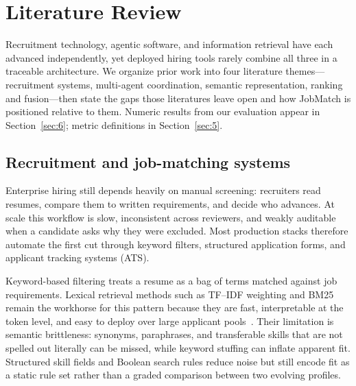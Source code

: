 \section{Literature Review}\label{sec:2}

Recruitment technology, agentic software, and information retrieval have each advanced independently, yet deployed hiring tools rarely combine all three in a traceable architecture.
We organize prior work into four literature themes---recruitment systems, multi-agent coordination, semantic representation, ranking and fusion---then state the gaps those literatures leave open and how JobMatch is positioned relative to them.
Numeric results from our evaluation appear in Section~\ref{sec:6}; metric definitions in Section~\ref{sec:5}.

\subsection{Recruitment and job-matching systems}\label{sec:2-recruitment}

Enterprise hiring still depends heavily on manual screening: recruiters read resumes, compare them to written requirements, and decide who advances.
At scale this workflow is slow, inconsistent across reviewers, and weakly auditable when a candidate asks why they were excluded.
Most production stacks therefore automate the first cut through keyword filters, structured application forms, and applicant tracking systems (ATS).

Keyword-based filtering treats a resume as a bag of terms matched against job requirements.
Lexical retrieval methods such as TF--IDF weighting and BM25 remain the workhorse for this pattern because they are fast, interpretable at the token level, and easy to deploy over large applicant pools~\cite{Manning2008,Robertson2009}.
Their limitation is semantic brittleness: synonyms, paraphrases, and transferable skills that are not spelled out literally can be missed, while keyword stuffing can inflate apparent fit.
Structured skill fields and Boolean search rules reduce noise but still encode fit as a static rule set rather than a graded comparison between two evolving profiles.

